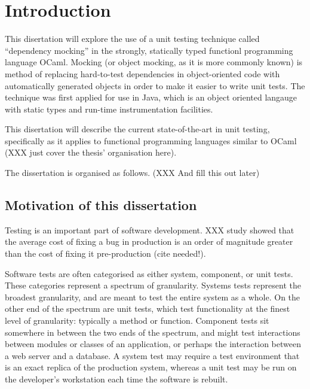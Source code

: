 \chapter{Introduction}

This disertation will explore the use of a unit testing technique
called ``dependency mocking'' in the strongly, statically typed
functionl programming language OCaml. Mocking (or object mocking, as
it is more commonly known) is method of replacing hard-to-test
dependencies in object-oriented code with automatically generated
objects in order to make it easier to write unit tests. The technique
was first applied for use in Java, which is an object oriented
langauge with static types and run-time instrumentation
facilities.

This disertation will describe the current state-of-the-art in unit
testing, specifically as it applies to functional programming
languages similar to OCaml (XXX just cover the thesis' organisation
here).

The dissertation is organised as follows. (XXX And fill this out
later)

\section{Motivation of this dissertation}



Testing is an important part of software development. XXX study showed
that the average cost of fixing a bug in production is an order of
magnitude greater than the cost of fixing it pre-production (cite
needed!).






Software tests are often categorised as either system, component, or
unit tests. These categories represent a spectrum of
granularity. Systems tests represent the broadest granularity, and are
meant to test the entire system as a whole. On the other end of the
spectrum are unit tests, which test functionality at the finest level
of granularity: typically a method or function. Component tests sit
somewhere in between the two ends of the spectrum, and might test
interactions between modules or classes of an application, or perhaps
the interaction between a web server and a database. A system test may
require a test environment that is an exact replica of the production
system, whereas a unit test may be run on the developer's workstation
each time the software is rebuilt.

